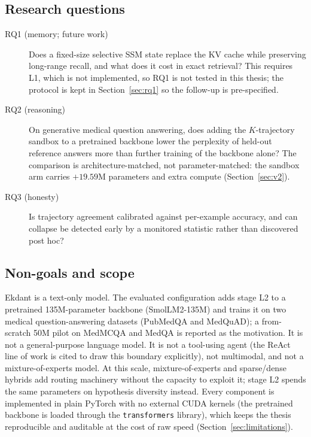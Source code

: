 \documentclass[11pt,a4paper]{article}
\theoremstyle{plain}
\theoremstyle{definition}
\theoremstyle{remark}
\begin{document}
\subsection{Research questions}

\begin{description}
  \item[RQ1 (memory; future work)] Does a fixed-size selective SSM state
    replace the KV cache while preserving long-range recall, and what does it
    cost in exact retrieval? This requires L1, which is not implemented, so
    RQ1 is not tested in this thesis; the protocol is kept in
    Section~\ref{sec:rq1} so the follow-up is pre-specified.
  \item[RQ2 (reasoning)] On generative medical question answering, does
    adding the $K$-trajectory sandbox to a pretrained backbone lower the
    perplexity of held-out reference answers more than further training of
    the backbone alone? The comparison is architecture-matched, not
    parameter-matched: the sandbox arm carries $+19.59$M parameters and extra
    compute (Section~\ref{sec:v2}).
  \item[RQ3 (honesty)] Is trajectory agreement calibrated against per-example
    accuracy, and can collapse be detected early by a monitored statistic
    rather than discovered post hoc?
\end{description}

\subsection{Non-goals and scope}

\noindent
Ekdant is a text-only model. The evaluated configuration adds stage L2 to a
pretrained 135M-parameter backbone (SmolLM2-135M) and trains it on two medical
question-answering datasets (PubMedQA and MedQuAD); a from-scratch 50M pilot on
MedMCQA and MedQA is reported as the motivation. It is not a general-purpose
language model. It is
not a tool-using agent (the ReAct line of work \cite{yao2022react} is cited to
draw this boundary explicitly), not multimodal, and not a mixture-of-experts
model. At this scale, mixture-of-experts and sparse/dense hybrids add routing
machinery without the capacity to exploit it; stage L2 spends the same
parameters on hypothesis diversity instead. Every component is implemented in
plain PyTorch with no external CUDA kernels (the pretrained backbone is loaded
through the \texttt{transformers} library), which keeps the thesis
reproducible and auditable at the cost of raw speed
(Section~\ref{sec:limitations}).
\end{document}
